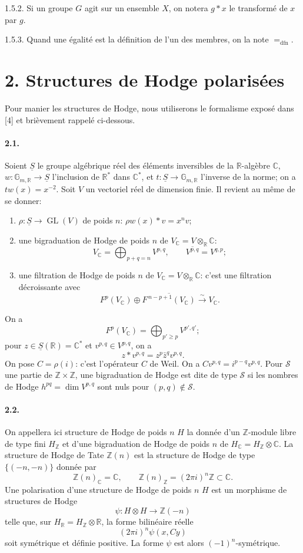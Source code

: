 \documentclass[10pt]{article}
\newcommand{\C}{\mathbb{C}}
\newcommand{\R}{\mathbb{R}}
\newcommand{\Z}{\mathbb{Z}}
\newcommand{\GL}{\operatorname{GL}}
\newcommand{\dfn}{\mathrm{dfn}}
\newcommand{\iso}{\xrightarrow{\sim}}
\begin{document}
1.5.2. Si un groupe $G$ agit sur un ensemble $X$, on notera $g*x$ le transformé de $x$ par $g$.

1.5.3. Quand une égalité est la définition de l'un des membres, on la note $=_{\dfn}$.

\section*{2. Structures de Hodge polarisées}

Pour manier les structures de Hodge, nous utiliserons le formalisme exposé dans [4] et brièvement rappelé ci-dessous.

\paragraph{2.1.} Soient $\underline S$ le groupe algébrique réel des éléments inversibles de la $\R$-algèbre $\C$, $w:\mathbb G_{m,\R}\to\underline S$ l'inclusion de $\R^*$ dans $\C^*$, et $t:\underline S\to\mathbb G_{m,\R}$ l'inverse de la norme; on a $tw(x)=x^{-2}$. Soit $V$ un vectoriel réel de dimension finie. Il revient au même de se donner:
\begin{enumerate}[label=\alph*)]
\item $\rho:\underline S\to\GL(V)$ de poids $n$: $\rho w(x)*v=x^n v$;
\item une bigraduation de Hodge de poids $n$ de $V_\C=V\otimes_\R\C$:
\[
V_\C=\bigoplus_{p+q=n}V^{p,q},\qquad \overline{V^{p,q}}=V^{q,p};
\]
\item une filtration de Hodge de poids $n$ de $V_\C=V\otimes_\R\C$: c'est une filtration décroissante avec
\[
F^p(V_\C)\oplus\overline{F^{\,n-p+1}(V_\C)}\iso V_\C.
\]
\end{enumerate}
On a
\[
F^p(V_\C)=\bigoplus_{p'\ge p}V^{p',q'};
\]
pour $z\in\underline S(\R)=\C^*$ et $v^{p,q}\in V^{p,q}$, on a
\[
z*v^{p,q}=z^p\bar z^qv^{p,q}.
\]
On pose $C=\rho(i)$: c'est l'opérateur $C$ de Weil. On a $Cv^{p,q}=i^{p-q}v^{p,q}$. Pour $\mathscr S$ une partie de $\Z\times\Z$, une bigraduation de Hodge est dite de type $\mathscr S$ si les nombres de Hodge $h^{pq}=\dim V^{p,q}$ sont nuls pour $(p,q)\notin\mathscr S$.

\paragraph{2.2.} On appellera ici structure de Hodge de poids $n$ $H$ la donnée d'un $\Z$-module libre de type fini $H_\Z$ et d'une bigraduation de Hodge de poids $n$ de $H_\C=H_\Z\otimes\C$. La structure de Hodge de Tate $\Z(n)$ est la structure de Hodge de type $\{(-n,-n)\}$ donnée par
\[
\Z(n)_\C=\C,
\qquad
\Z(n)_\Z=(2\pi i)^n\Z\subset\C.
\]
Une polarisation d'une structure de Hodge de poids $n$ $H$ est un morphisme de structures de Hodge
\[
\psi:H\otimes H\longrightarrow\Z(-n)
\]
telle que, sur $H_\R=H_\Z\otimes\R$, la forme bilinéaire réelle
\[
(2\pi i)^n\psi(x,Cy)
\]
soit symétrique et définie positive. La forme $\psi$ est alors $(-1)^n$-symétrique.
\end{document}
